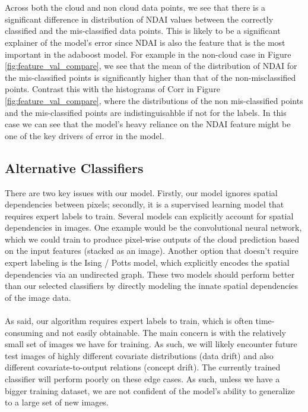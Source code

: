 \documentclass[11pt, letterpaper, journal]{IEEEtran}
\begin{document}
\\
\\
Across both the cloud and non cloud data points, we see that there is a significant difference in distribution of NDAI values between the correctly classified and the mis-classified data points. This is likely to be a significant explainer of the model's error since NDAI is also the feature that is the most important in the adaboost model. For example in the non-cloud case in Figure \ref{fig:feature_val_compare}, we see that the mean of the distribution of NDAI for the mis-classified points is significantly higher than that of the non-misclassified points. Contrast this with the histograms of Corr in Figure \ref{fig:feature_val_compare}, where the distributions of the non mis-classified points and the mis-classified points are indistinguisahble if not for the labels. In this case we can see that the model's heavy reliance on the NDAI feature might be one of the key drivers of error in the model.

\subsection{Alternative Classifiers}
There are two key issues with our model. Firstly, our model ignores spatial dependencies between pixels; secondly, it is a supervised learning model that requires expert labels to train. Several models can explicitly account for spatial dependencies in images. One example would be the convolutional neural network, which we could train to produce pixel-wise outputs of the cloud prediction based on the input features (stacked as an image). Another option that doesn't require expert labeling is the Ising / Potts model, which explicitly encodes the spatial dependencies via an undirected graph. These two models should perform better than our selected classifiers by directly modeling the innate spatial dependencies of the image data.
\\
\\
As said, our algorithm requires expert labels to train, which is often time-consuming and not easily obtainable. The main concern is with the relatively small set of images we have for training. As such, we will likely encounter future test images of highly different covariate distributions (data drift) and also different covariate-to-output relations (concept drift). The currently trained classifier will perform poorly on these edge cases. As such, unless we have a bigger training dataset, we are not confident of the model's ability to generalize to a large set of new images.
\end{document}
